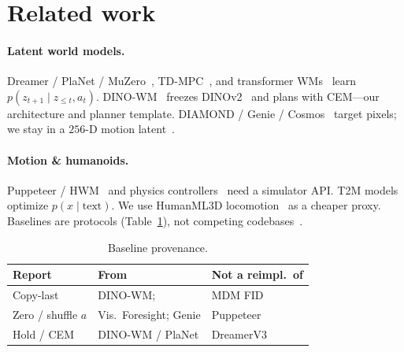 \documentclass[10pt,twocolumn]{article}
\begin{document}
\section{Related work}

\paragraph{Latent world models.}
Dreamer / PlaNet / MuZero~\cite{hafner2020dreamerv2,hafner2025dreamerv3,hafner2019planet,schrittwieser2020muzero}, TD-MPC~\cite{hansen2022tdmpc,hansen2024tdmpc2}, and transformer WMs~\cite{seo2023masked,micheli2023transformers,robine2023transformer} learn $p(z_{t+1}\mid z_{\le t},a_t)$.
DINO-WM~\cite{zhou2024dinowm} freezes DINOv2~\cite{oquab2024dinov2} and plans with CEM---our architecture and planner template.
DIAMOND / Genie / Cosmos~\cite{alonso2024diamond,bruce2024genie,nvidia2025cosmos} target pixels; we stay in a $256$-D motion latent~\cite{assran2023vjepa,moerland2023modelbased}.

\paragraph{Motion \& humanoids.}
Puppeteer / HWM~\cite{hansen2024puppeteer,ali2025hwm} and physics controllers~\cite{peng2018deepmimic,won2022physics,ling2020character,luo2023perpetual,rempe2021humor,yuan2023physdiff} need a simulator API.
T2M models~\cite{tevet2023mdm,chen2023executing,zhang2023remodiffuse,jiang2024motiongpt,shafir2024human} optimize $p(x\mid\text{text})$.
We use HumanML3D locomotion~\cite{guo2022humanml3d,mahmood2019amass,punnakkal2021babel,loper2015smpl} as a cheaper proxy.
Baselines are protocols (Table~\ref{tab:provenance}), not competing codebases~\cite{mathieu2016video,oh2015action,finn2016unsupervised,rubinstein1999cem}.

\begin{table}[ht]
\centering
\vspace{-0.2em}
\caption{Baseline provenance.}
\label{tab:provenance}
\scriptsize
\setlength{\tabcolsep}{3pt}
\begin{tabular}{@{}lll@{}}
\toprule
Report & From & Not a reimpl.\ of \\
\midrule
Copy-last & DINO-WM;~\cite{mathieu2016video} & MDM FID \\
Zero / shuffle $a$ & Vis.\ Foresight; Genie & Puppeteer \\
Hold / CEM & DINO-WM / PlaNet & DreamerV3 \\
\bottomrule
\end{tabular}
\vspace{-0.6em}
\end{table}
\end{document}
